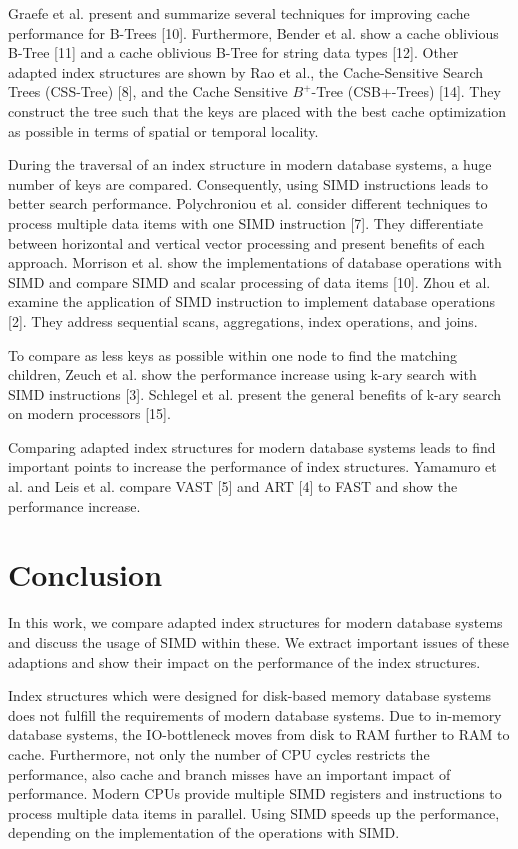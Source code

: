 \documentclass[conference]{IEEEtran}
\begin{document}
Graefe et al. present and summarize several techniques for improving cache performance for B-Trees [10]. Furthermore,
Bender et al. show a cache oblivious B-Tree [11] and
a cache oblivious B-Tree for string data types [12]. Other adapted index structures are shown by Rao et al., the Cache-Sensitive
Search Trees (CSS-Tree) [8], and the Cache Sensitive $B^+$-Tree (CSB+-Trees) [14]. They construct the
tree such that the keys are placed with the best cache optimization as possible in terms of spatial or temporal locality.

During the traversal of an index structure in modern database systems, a huge number of keys are compared. Consequently, using SIMD instructions leads to better search performance. Polychroniou et al. consider different techniques to process multiple data items with one SIMD instruction [7]. They differentiate between horizontal and vertical vector processing and present benefits of each approach. Morrison et al. show the implementations of database operations with SIMD and compare SIMD and scalar processing of data items [10]. Zhou et al. examine the application of SIMD instruction
to implement database operations [2]. They address sequential scans, aggregations, index operations, and joins.

To compare as less keys as possible within one node to find the matching children, Zeuch et al. show the performance increase using k-ary search with SIMD instructions [3]. Schlegel et al. present the general benefits of k-ary search on modern processors [15]. 

Comparing adapted index structures for modern database systems leads to find important points to increase the performance of index structures. Yamamuro et al. and Leis et al. compare VAST [5] and ART [4] to FAST and show the performance increase. 

\section{Conclusion}
In this work, we compare adapted index structures for modern database systems and discuss the usage of SIMD within these. We extract important issues of these adaptions and show their impact on the performance of the index structures. 

Index structures which were designed for disk-based memory database systems does not fulfill the requirements of modern database systems. Due to in-memory database systems, the IO-bottleneck moves from disk to RAM further to RAM to cache. Furthermore, not only the number of CPU cycles restricts the performance, also cache and branch misses have an important impact of performance. Modern CPUs provide multiple SIMD registers and instructions to process multiple data items in parallel. Using SIMD speeds up the performance, depending on the implementation of the operations with SIMD.
\end{document}
